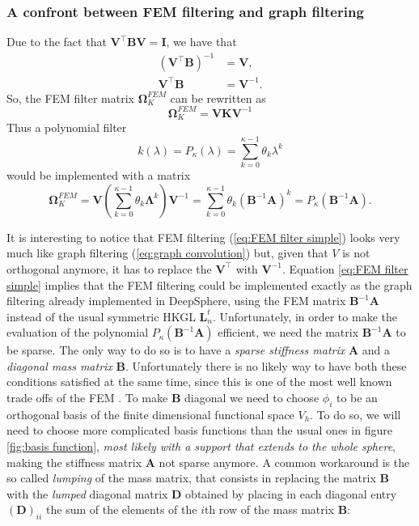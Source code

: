 \subsubsection{A confront between FEM filtering and graph filtering}\label{sec:FEM filtering as a graph filtering}
Due to the fact that 
$
\mathbf V^\intercal\mathbf B\mathbf V = \mathbf I
$,
we have that 
$$
\begin{aligned}
	(\mathbf V^\intercal\mathbf B)^{-1} &= \mathbf V,\\
	\mathbf V^\intercal\mathbf B &= \mathbf V^{-1}.
\end{aligned}
$$
So, the FEM filter matrix $\mathbf \Omega_K^{FEM}$ can be rewritten as 
\begin{equation}\label{eq:FEM filter simple}
	 \mathbf \Omega_K^{FEM}  = \mathbf V \mathbf K \mathbf V^{-1}
\end{equation}
Thus a polynomial filter
$$
k(\lambda)=P_\kappa(\lambda) = \sum_{k=0}^{\kappa-1} \theta_k \lambda^k
$$
would be implemented with a matrix
$$
\mathbf\Omega_K^{FEM} = \mathbf V \left(\sum_{k=0}^{\kappa-1} \theta_k \mathbf \Lambda^k \right)\mathbf V^{-1} = \sum_{k=0}^{\kappa-1} \theta_k (\mathbf B^{-1}\mathbf A)^k = P_\kappa(\mathbf B^{-1}\mathbf A).
$$

It is interesting to notice that FEM filtering (\ref{eq:FEM filter simple}) looks very much like graph filtering (\ref{eq:graph convolution}) but, given that $V$ is not orthogonal anymore, it has to replace the $\mathbf V^\intercal$ with $\mathbf V^{-1}$. Equation \ref{eq:FEM filter simple} implies that the FEM filtering could be implemented exactly as the graph filtering already implemented in DeepSphere, using the FEM matrix $\mathbf B^{-1}\mathbf A$ instead of the usual symmetric HKGL $\mathbf L_n^t$. Unfortunately, in order to make the evaluation of the polynomial $P_\kappa(\mathbf B^{-1}\mathbf A)$ efficient, we need the matrix $\mathbf B^{-1}\mathbf A$ to be sparse. The only way to do so is to have a \textit{sparse stiffness matrix} $\mathbf A$ and a \textit{diagonal mass matrix} $\mathbf B$. Unfortunately there is no likely way to have both these conditions satisfied at the same time, since this is one of the most well known trade offs of the FEM \cite{Strang}. To make $\mathbf B$ diagonal we need to choose $\phi_i$ to be an orthogonal basis of the finite dimensional functional space $V_h$. To do so, we will need to choose more complicated basis functions than the usual ones in figure \ref{fig:basis function}, \textit{most likely with a support that extends to the whole sphere}, making the stiffness matrix $\mathbf A$ not sparse anymore. A common workaround \cite{Strang} is the so called \textit{lumping} of the mass matrix, that consists in replacing the matrix $\mathbf B$ with the \textit{lumped} diagonal matrix $\mathbf D$ obtained by placing in each diagonal entry $(\mathbf D)_{ii}$ the sum of the elements of the $i$th row of the mass matrix $\mathbf B$:

